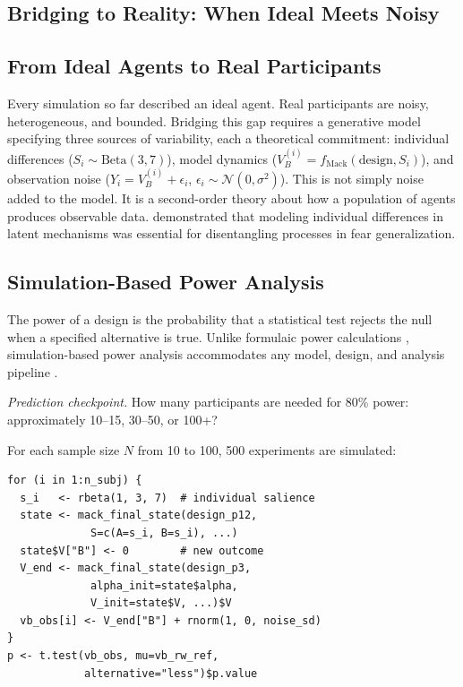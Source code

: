 \documentclass[fleqn,10pt]{wlscirep}
\begin{document}
\begin{linenumbers}
\section{Bridging to Reality: When Ideal Meets Noisy}

\subsection{From Ideal Agents to Real Participants}

Every simulation so far described an ideal agent. Real participants are noisy, heterogeneous, and bounded. Bridging this gap requires a generative model specifying three sources of variability, each a theoretical commitment: individual differences ($S_i \sim \text{Beta}(3, 7)$), model dynamics ($V_B^{(i)} = f_{\text{Mack}}(\text{design}, S_i)$), and observation noise ($Y_i = V_B^{(i)} + \epsilon_i$, $\epsilon_i \sim \mathcal{N}(0, \sigma^2)$). This is not simply noise added to the model. It is a second-order theory about how a population of agents produces observable data. \citet{yu2023fear} demonstrated that modeling individual differences in latent mechanisms was essential for disentangling processes in fear generalization.

\subsection{Simulation-Based Power Analysis}

The power of a design is the probability that a statistical test rejects the null when a specified alternative is true. Unlike formulaic power calculations \citep{cohen1992power}, simulation-based power analysis accommodates any model, design, and analysis pipeline \citep{debruine2021understanding, brysbaert2018power, green2016simr}.

\emph{Prediction checkpoint.} How many participants are needed for 80\% power: approximately 10--15, 30--50, or 100+?

For each sample size $N$ from 10 to 100, 500 experiments are simulated:
\begin{verbatim}
for (i in 1:n_subj) {
  s_i   <- rbeta(1, 3, 7)  # individual salience
  state <- mack_final_state(design_p12,
             S=c(A=s_i, B=s_i), ...)
  state$V["B"] <- 0        # new outcome
  V_end <- mack_final_state(design_p3,
             alpha_init=state$alpha,
             V_init=state$V, ...)$V
  vb_obs[i] <- V_end["B"] + rnorm(1, 0, noise_sd)
}
p <- t.test(vb_obs, mu=vb_rw_ref,
            alternative="less")$p.value
\end{verbatim}


\end{linenumbers}
\end{document}
